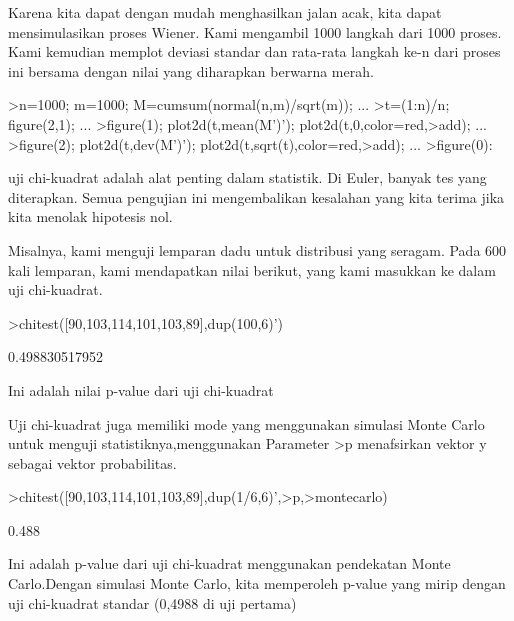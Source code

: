 \documentclass[a4paper,10pt]{article}
\begin{document}
\begin{eulernotebook}
\begin{eulercomment}
\begin{eulercomment}
\begin{eulercomment}
Karena kita dapat dengan mudah menghasilkan jalan acak, kita dapat
mensimulasikan proses Wiener. Kami mengambil 1000 langkah dari 1000
proses. Kami kemudian memplot deviasi standar dan rata-rata langkah
ke-n dari proses ini bersama dengan nilai yang diharapkan berwarna
merah.
\end{eulercomment}
\begin{eulerprompt}
>n=1000; m=1000; M=cumsum(normal(n,m)/sqrt(m)); ...
>t=(1:n)/n; figure(2,1); ...
>figure(1); plot2d(t,mean(M')'); plot2d(t,0,color=red,>add); ...
>figure(2); plot2d(t,dev(M')'); plot2d(t,sqrt(t),color=red,>add); ...
>figure(0):
\end{eulerprompt}
\begin{eulercomment}
uji chi-kuadrat adalah alat penting dalam statistik. Di Euler, banyak
tes yang diterapkan. Semua pengujian ini mengembalikan kesalahan yang
kita terima jika kita menolak hipotesis nol.

Misalnya, kami menguji lemparan dadu untuk distribusi yang seragam.
Pada 600 kali lemparan, kami mendapatkan nilai berikut, yang kami
masukkan ke dalam uji chi-kuadrat.
\end{eulercomment}
\begin{eulerprompt}
>chitest([90,103,114,101,103,89],dup(100,6)')
\end{eulerprompt}
\begin{euleroutput}
  0.498830517952
\end{euleroutput}
\begin{eulercomment}
Ini adalah nilai p-value dari uji chi-kuadrat

Uji chi-kuadrat juga memiliki mode yang menggunakan simulasi Monte
Carlo untuk menguji statistiknya,menggunakan Parameter \textgreater{}p menafsirkan
vektor y sebagai vektor probabilitas.
\end{eulercomment}
\begin{eulerprompt}
>chitest([90,103,114,101,103,89],dup(1/6,6)',>p,>montecarlo)
\end{eulerprompt}
\begin{euleroutput}
  0.488
\end{euleroutput}
\begin{eulercomment}
Ini adalah p-value dari uji chi-kuadrat menggunakan pendekatan Monte
Carlo.Dengan simulasi Monte Carlo, kita memperoleh p-value yang mirip
dengan uji chi-kuadrat standar (0,4988 di uji pertama)


\end{eulercomment}
\end{eulercomment}
\end{eulercomment}
\end{eulernotebook}
\end{document}
